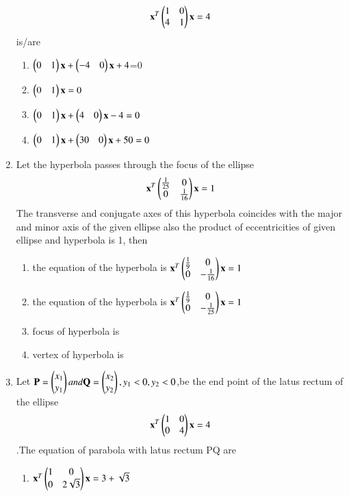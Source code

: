 \begin{enumerate}[label=\arabic*.,ref=\thesubsection.\theenumi]
\begin{align}
    \mathbf{x}^T\begin{pmatrix} 1& 0 \\4 & 1 \end{pmatrix} \mathbf{x}=4
    \end{align} is/are 
    \begin{enumerate}
    \item $\begin{pmatrix}0&1\end{pmatrix}\mathbf{x}+\begin{pmatrix}-4&0\end{pmatrix}\mathbf{x}+4$=0
    \item $\begin{pmatrix}0&1\end{pmatrix}\mathbf{x}=0$
    \item $\begin{pmatrix}0&1\end{pmatrix}\mathbf{x}+\begin{pmatrix}4&0\end{pmatrix}\mathbf{x}-4=0$
    \item $\begin{pmatrix}0&1\end{pmatrix}\mathbf{x}+\begin{pmatrix}30&0\end{pmatrix}\mathbf{x}+50=0$
    \end{enumerate}
    \item Let the hyperbola passes through the focus of the ellipse 
    \begin{align} 
    \mathbf{x}^T\begin{pmatrix}\frac{1}{25}& 0 \\0 & \frac{1}{16}\end{pmatrix} \mathbf{x}=1
    \end{align} The transverse and conjugate axes of this hyperbola coincides with the major and minor axis of the given ellipse also the product of eccentricities of given ellipse and hyperbola is 1, then 
    \begin{enumerate}
    \item the equation of the hyperbola is 
    $\mathbf{x}^T \begin{pmatrix}\frac{1}{9}&0 \\0 & -\frac{1}{16}\end{pmatrix} \mathbf{x} =1$
    \item the equation of the hyperbola is
    $\mathbf{x}^T \begin{pmatrix}\frac{1}{9}& 0 \\0 & -\frac{1}{25}\end{pmatrix}\mathbf{x}=1$
    \item focus of hyperbola is 
    \item vertex of hyperbola is 
    \end{enumerate}
    \item Let $\mathbf{P}=\begin{pmatrix}x_1\\y_1\end{pmatrix}and \mathbf{Q}=\begin{pmatrix}x_2\\y_2\end{pmatrix},y_1<0,y_2<0$,be the end point of the latus rectum of the ellipse 
    \begin{align}
    \mathbf{x}^T\begin{pmatrix}1& 0 \\0 & 4\end{pmatrix} \mathbf{x}=4
    \end{align}.The equation of parabola with latus rectum PQ are
    \begin{enumerate}
    \item $\mathbf{x}^T \begin{pmatrix} 1& 0 \\0 & 2\sqrt{3} \end{pmatrix} \mathbf{x}=3+\sqrt{3}$

\end{enumerate}
\end{enumerate}
